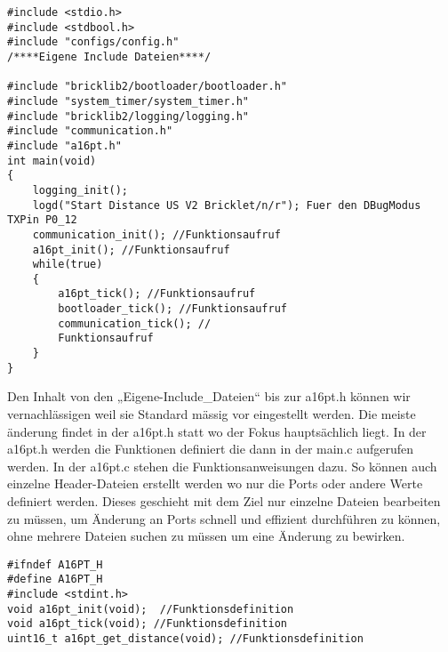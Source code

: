 \begin{lstlisting}
#include <stdio.h>
#include <stdbool.h>
#include "configs/config.h"
/****Eigene Include Dateien****/

#include "bricklib2/bootloader/bootloader.h"
#include "system_timer/system_timer.h"
#include "bricklib2/logging/logging.h"
#include "communication.h"
#include "a16pt.h"
int main(void)
{ 
	logging_init(); 
	logd("Start Distance US V2 Bricklet/n/r"); Fuer den DBugModus TXPin P0_12 
	communication_init(); //Funktionsaufruf
	a16pt_init(); //Funktionsaufruf	
	while(true)
	{
		a16pt_tick(); //Funktionsaufruf
		bootloader_tick(); //Funktionsaufruf
		communication_tick(); //
		Funktionsaufruf
	}
}
\end{lstlisting}
Den Inhalt von den „Eigene-Include\_Dateien“ bis zur a16pt.h können wir vernachlässigen weil sie Standard mässig vor eingestellt werden.
Die meiste änderung findet in der a16pt.h statt wo der Fokus hauptsächlich liegt.
In der a16pt.h werden die Funktionen definiert die dann in der main.c aufgerufen werden. In der a16pt.c stehen die Funktionsanweisungen dazu. So können auch einzelne Header-Dateien erstellt werden wo nur die Ports oder andere Werte definiert werden. Dieses geschieht mit dem Ziel nur einzelne Dateien bearbeiten zu müssen, um Änderung an Ports schnell und effizient durchführen zu können, ohne mehrere Dateien suchen zu müssen um eine Änderung zu bewirken.\\
\begin{lstlisting}
#ifndef A16PT_H
#define A16PT_H
#include <stdint.h>
void a16pt_init(void);	//Funktionsdefinition
void a16pt_tick(void); //Funktionsdefinition
uint16_t a16pt_get_distance(void); //Funktionsdefinition
\end{lstlisting}

